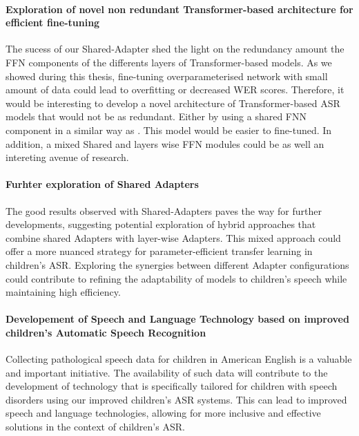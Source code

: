\paragraph*{Exploration of novel non redundant Transformer-based architecture for efficient fine-tuning} The sucess of our Shared-Adapter shed the light on the redundancy amount the \ac{FFN} components of the differents layers of Transformer-based models. As we showed during this thesis, fine-tuning  overparameterised network with small amount of data could lead to overfitting or decreased \ac{WER} scores. Therefore, it would be interesting to develop a novel architecture of Transformer-based \ac{ASR} models that would not be as redundant. Either by using a shared FNN component in a similar way as \cite{pires2023one}. This model would be easier to fine-tuned. In addition, a mixed Shared and layers wise \ac{FFN} modules could be as well an intereting avenue of research.

\paragraph*{Furhter exploration of Shared Adapters} The good results observed with Shared-Adapters paves the way for further developments, suggesting potential exploration of hybrid approaches that combine shared Adapters with layer-wise Adapters. This mixed approach could offer a more nuanced strategy for parameter-efficient transfer learning in children's \ac{ASR}. Exploring the synergies between different Adapter configurations could contribute to refining the adaptability of models to children's speech while maintaining high efficiency.

\paragraph*{Developement of Speech and Language Technology based on improved children's Automatic Speech Recognition} Collecting pathological speech data for children in American English is a valuable and important initiative. The availability of such data will contribute to the development of technology that is specifically tailored for children with speech disorders using our improved children's \ac{ASR} systems. This can lead to improved speech and language technologies, allowing for more inclusive and effective solutions in the context of children's \ac{ASR}. 